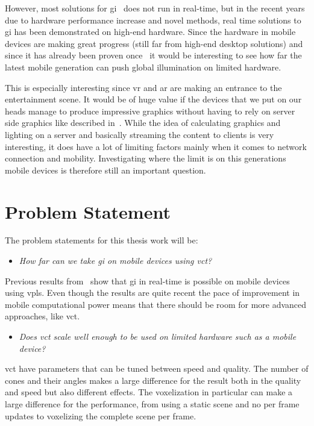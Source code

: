 \documentclass[a4paper, 12pt]{article}
\begin{document}
However, most solutions for \gls{gi}~\cite{sotagi} does not run in real-time, but in the recent years due to hardware performance increase and novel methods, real time solutions to \gls{gi} has been demonstrated on high-end hardware. Since the hardware in mobile devices are making great progress (still far from high-end desktop solutions) and since it has already been proven once~\cite{gimobile} it would be interesting to see how far the latest mobile generation can push global illumination on limited hardware.

This is especially interesting since \gls{vr} and \gls{ar} are making an entrance to the entertainment scene. It would be of huge value if the devices that we put on our heads manage to produce impressive graphics without having to rely on server side graphics like described in~\cite{cloudlight}. While the idea of calculating graphics and lighting on a server and basically streaming the content to clients is very interesting, it does have a lot of limiting factors mainly when it comes to network connection and mobility. Investigating where the limit is on this generations mobile devices is therefore still an important question.

\section{Problem Statement}
\label{sec:Problem Statement}

The problem statements for this thesis work will be:

\begin{itemize}
  \item \textit{How far can we take \gls{gi} on mobile devices using \gls{vct}?}
\end{itemize}

Previous results from~\cite{gimobile} show that \gls{gi} in real-time is possible on mobile devices using \glspl{vpl}. Even though the results are quite recent the pace of improvement in mobile computational power means that there should be room for more advanced approaches, like \gls{vct}.

\begin{itemize}
  \item \textit{Does \gls{vct} scale well enough to be used on limited hardware such as a mobile device?}
\end{itemize}

\gls{vct} have parameters that can be tuned between speed and quality. The number of cones and their angles makes a large difference for the result both in the quality and speed but also different effects. The voxelization in particular can make a large difference for the performance, from using a static scene and no per frame updates to voxelizing the complete scene per frame.
\end{document}
